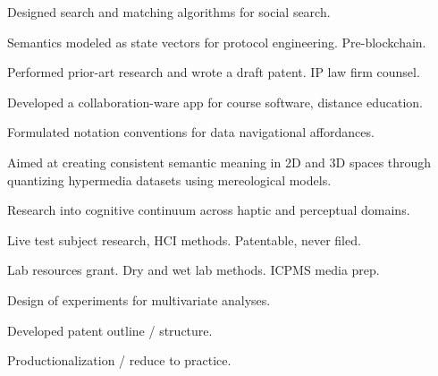 \documentclass[letterpaper]{deedy-resume} %
\begin{document}
\begin{minipage}[t]{1\textwidth}
\sectionspace %





\begin{tightitemize}
\item Designed search and matching algorithms for social search.
\item Semantics modeled as state vectors for protocol engineering.  Pre-blockchain.
\item Performed prior-art research and wrote a draft patent. IP law firm counsel.
\item Developed a collaboration-ware app for course software, distance education.
\end{tightitemize}

\sectionspace %



\begin{tightitemize}
\item Formulated notation conventions for data navigational affordances.
\item Aimed at creating consistent semantic meaning in 2D and 3D spaces through quantizing hypermedia datasets using mereological models.
\item Research into cognitive continuum across haptic and perceptual domains.  
\item Live test subject research, HCI methods.  Patentable, never filed.
\end{tightitemize}

\sectionspace %




\begin{tightitemize}
\item Lab resources grant. Dry and wet lab methods. ICPMS media prep.
\item Design of experiments for multivariate analyses.
\item Developed patent outline / structure.
\item Productionalization / reduce to practice.  
\end{tightitemize}

\sectionspace %





\end{minipage} %

\end{document}
